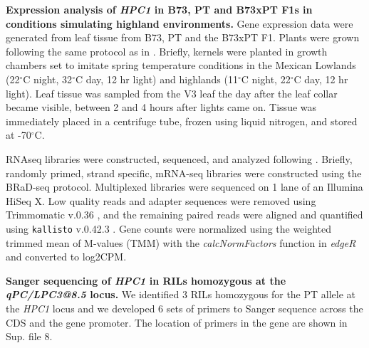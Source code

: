 \documentclass[9pt,twocolumn,twoside,lineno]{BioRxiv}
\begin{document}
\textbf{Expression analysis of \textit{HPC1} in B73, PT and B73xPT F1s in conditions simulating highland environments.}
Gene expression data were generated from leaf tissue from B73, PT and the B73xPT F1. 
Plants were grown following the same protocol as in \cite{Crow2020-gene}.
Briefly, kernels were planted in growth chambers set to imitate spring temperature conditions in the Mexican Lowlands (22$^{\circ}$C night, 32$^{\circ}$C day, 12 hr light) and highlands (11$^{\circ}$C night, 22$^{\circ}$C day, 12 hr light). 
Leaf tissue was sampled from the V3 leaf the day after the leaf collar became visible, between 2 and 4 hours after lights came on. Tissue was immediately placed in a centrifuge tube, frozen using liquid nitrogen, and stored at -70$^{\circ}$C.

RNAseq libraries were constructed, sequenced, and analyzed following \cite{Crow2020-gene}. 
Briefly, randomly primed, strand specific, mRNA-seq libraries were constructed using the BRaD-seq \cite{townsley2015brad} protocol.
Multiplexed libraries were sequenced on 1 lane of an Illumina HiSeq X. 
Low quality reads and adapter sequences were removed using Trimmomatic v.0.36 \cite{bolger2014trimmomatic}, and the remaining paired reads were aligned and quantified using \texttt{kallisto} v.0.42.3 \cite{bray2016near}. 
Gene counts were normalized using the weighted trimmed mean of M-values (TMM) with the \textit{calcNormFactors} function in \textit{edgeR} \cite{robinson2010edger} and converted to log2CPM.

\textbf{Sanger sequencing of \textit{HPC1} in RILs homozygous at the \textit{qPC/LPC3@8.5} locus.}
We identified 3 RILs homozygous for the PT allele at the \textit{HPC1} locus and we developed 6 sets of primers to Sanger sequence across the CDS and the gene promoter. 
The location of primers in the gene are shown in Sup. file 8. 
\end{document}

